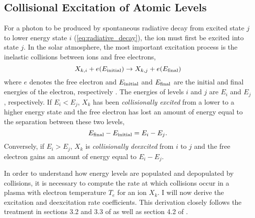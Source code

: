 \subsection{Collisional Excitation of Atomic Levels}\label{subsec:collisional_excitation}

For a photon to be produced by spontaneous radiative decay from excited state $j$ to lower energy state $i$ (\autoref{eq:radiative_decay}), the ion must first be excited into state $j$. In the solar atmosphere, the most important excitation process is the inelastic collisions between ions and free electrons,
\begin{equation}\label{eq:inelastic_collisions}
    X_{k,i} + e(E_{\textup{initial}}) \to X_{k,j} + e(E_{\textup{final}})
\end{equation}
where $e$ denotes the free electron and $E_{\textup{initial}}$ and $E_{\textup{final}}$ are the initial and final energies of the electron, respectively \citep{phillips_ultraviolet_2008}. The energies of levels $i$ and $j$ are $E_i$ and $E_j$, respectively. If $E_i<E_j$, $X_k$ has been \textit{collisionally excited} from a lower to a higher energy state and the free electron has lost an amount of energy equal to the separation between these two levels,
\begin{equation*}
    E_{\textup{final}} - E_{\textup{initial}}  = E_i - E_j.
\end{equation*}
Conversely, if $E_i>E_j$, $X_k$ is \textit{collisionally deexcited} from $i$ to $j$ and the free electron gains an amount of energy equal to $E_i - E_j$.

In order to understand how energy levels are populated and depopulated by collisions, it is necessary to compute the rate at which collisions occur in a plasma with electron temperature $T_e$ for an ion $X_k$. I will now derive the excitation and deexcitation rate coefficients. This derivation closely follows the treatment in sections 3.2 and 3.3 of \citet{del_zanna_solar_2018} as well as section 4.2 of \citet{phillips_ultraviolet_2008}.  

